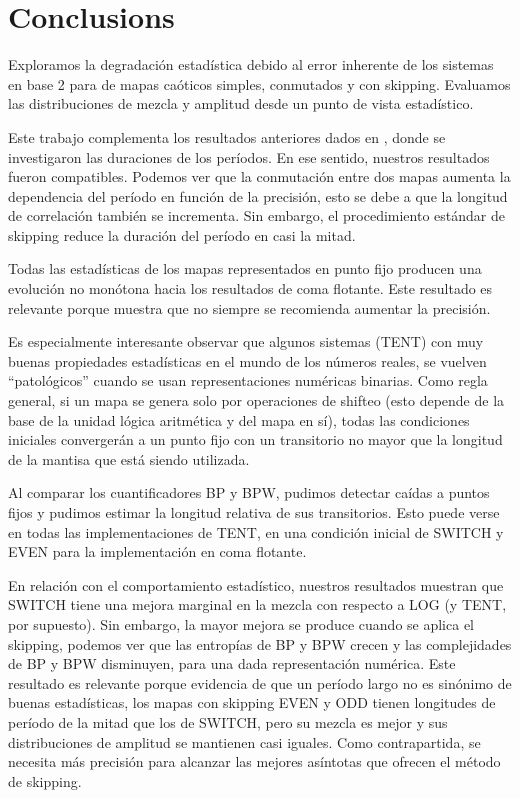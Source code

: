 \section{Conclusions}\label{sec:conclusions}

Exploramos la degradación estadística debido al error inherente de los sistemas en base 2 para de mapas caóticos simples, conmutados y con skipping.
Evaluamos las distribuciones de mezcla y amplitud desde un punto de vista estadístico.

Este trabajo complementa los resultados anteriores dados en \cite{Nagaraj2008}, donde se investigaron las duraciones de los períodos.
En ese sentido, nuestros resultados fueron compatibles.
Podemos ver que la conmutación entre dos mapas aumenta la dependencia del período en función de la precisión, esto se debe a que la longitud de correlación también se incrementa.
Sin embargo, el procedimiento estándar de skipping reduce la duración del período en casi la mitad.

Todas las estadísticas de los mapas representados en punto fijo producen una evolución no monótona hacia los resultados de coma flotante.
Este resultado es relevante porque muestra que no siempre se recomienda aumentar la precisión.

Es especialmente interesante observar que algunos sistemas (TENT) con muy buenas propiedades estadísticas en el mundo de los números reales, se vuelven ``patológicos'' cuando se usan representaciones numéricas binarias.
Como regla general, si un mapa se genera solo por operaciones de shifteo (esto depende de la base de la unidad lógica aritmética y del mapa en sí), todas las condiciones iniciales convergerán a un punto fijo con un transitorio no mayor que la longitud de la mantisa que está siendo utilizada.

Al comparar los cuantificadores BP y BPW, pudimos detectar caídas a puntos fijos y pudimos estimar la longitud relativa de sus transitorios.
Esto puede verse en todas las implementaciones de TENT, en una condición inicial de SWITCH y EVEN para la implementación en coma flotante.

En relación con el comportamiento estadístico, nuestros resultados muestran que SWITCH tiene una mejora marginal en la mezcla con respecto a LOG (y TENT, por supuesto).
Sin embargo, la mayor mejora se produce cuando se aplica el skipping, podemos ver que las entropías de BP y BPW crecen y las complejidades de BP y BPW disminuyen, para una dada representación numérica.
Este resultado es relevante porque evidencia de que un período largo no es sinónimo de buenas estadísticas, los mapas con skipping EVEN y ODD tienen longitudes de período de la mitad que los de SWITCH, pero su mezcla es mejor y sus distribuciones de amplitud se mantienen casi iguales.
Como contrapartida, se necesita más precisión para alcanzar las mejores asíntotas que ofrecen el método de skipping.
